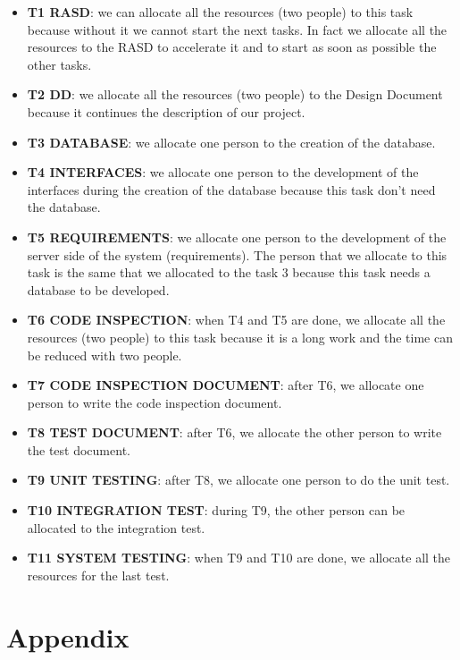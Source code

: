 \documentclass[18pt,oneside,a4paper, titlepage]{article}
\begin{document}
	\begin{itemize}
		\item \textbf{T1 RASD}: we can allocate all the resources (two people) to this task because without it we cannot start the next tasks. In fact we allocate all the resources to the RASD to accelerate it and to start as soon as possible the other tasks.
		\item \textbf{T2 DD}: we allocate all the resources (two people) to the Design Document because it continues the description of our project.
		\item \textbf{T3 DATABASE}: we allocate one person to the creation of the database.
		\item \textbf{T4 INTERFACES}: we allocate one person to the development of the interfaces during the creation of the database because this task don't need the database.
		\item \textbf{T5 REQUIREMENTS}: we allocate one person to the development of the server side of the system (requirements). The person that we allocate to this task is the same that we allocated to the task 3 because this task needs a database to be developed.
		\item \textbf{T6 CODE INSPECTION}: when T4 and T5 are done, we allocate all the resources (two people) to this task because it is a long work and the time can be reduced with two people.
		\item \textbf{T7 CODE INSPECTION DOCUMENT}: after T6, we allocate one person to write the code inspection document.
		\item \textbf{T8 TEST DOCUMENT}: after T6, we allocate the other person to write the test document.
		\item \textbf{T9 UNIT TESTING}: after T8, we allocate one person to do the unit test.
		\item \textbf{T10 INTEGRATION TEST}: during T9, the other person can be allocated to the integration test.
		\item \textbf{T11 SYSTEM TESTING}: when T9 and T10 are done, we allocate all the resources for the last test.
	\end{itemize}

\newpage
	
\newpage
\section{Appendix}
\end{document}
